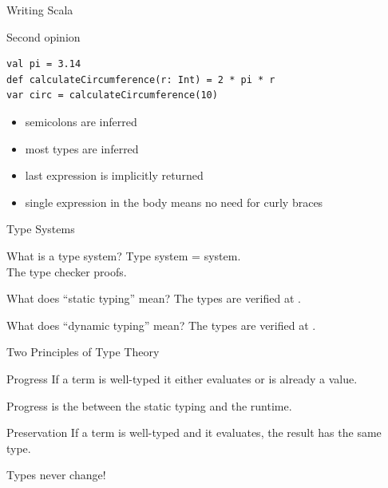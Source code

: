 \begin{frame}[fragile]{Writing Scala}
\begin{exampleblock}{Second opinion}
\begin{lstlisting}
val pi = 3.14
def calculateCircumference(r: Int) = 2 * pi * r
var circ = calculateCircumference(10)
\end{lstlisting}
\end{exampleblock}
\pause
\begin{itemize}
  \item semicolons are inferred
  \item most types are inferred
  \item last expression is implicitly returned
  \item single expression in the body means no need for curly braces
\end{itemize}
\end{frame}

\begin{frame}{Type Systems}
\begin{block}{What is a type system?}
\pause
Type system =  system.\\
The type checker  proofs.
\end{block}
\pause
\begin{block}{What does ``static typing'' mean?}
\pause
The types are verified at .
\end{block}
\pause
\begin{block}{What does ``dynamic typing'' mean?}
\pause
The types are verified at .
\end{block}
\end{frame}

\begin{frame}{Two Principles of Type Theory}
\begin{block}{Progress}
If a term is well-typed it either evaluates or is already a value.
\end{block}
\pause
\begin{center}
Progress is the  between the static typing and the
runtime.
\end{center}
\pause
\begin{block}{Preservation}
If a term is well-typed and it evaluates, the result has the same type.
\end{block}
\begin{center}
\pause
Types \alert{never} change!
\end{center}
\end{frame}

